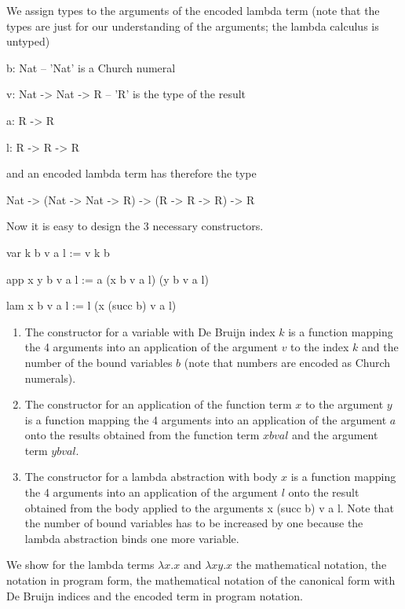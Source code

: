 \documentclass[12pt]{article}
\begin{document}
We assign types to the arguments of the encoded lambda term (note that the types
are just for our understanding of the arguments; the lambda calculus is untyped)
\begin{lam}
    b: Nat                  -- 'Nat' is a Church numeral

    v: Nat -> Nat -> R      -- 'R' is the type of the result

    a: R -> R

    l: R -> R -> R
\end{lam}
%
and an encoded lambda term has therefore the type
%
\begin{lam}
    Nat -> (Nat -> Nat -> R) -> (R -> R -> R) -> R
\end{lam}
%
%
Now it is easy to design the 3 necessary constructors.
\begin{lam}
    var k       b v a l  :=  v k b

    app x y     b v a l  :=  a (x b v a l) (y b v a l)

    lam x       b v a l  :=  l (x (succ b) v a l)
\end{lam}
%
\begin{enumerate}

    \item The constructor for a variable with De Bruijn index $k$ is a function
        mapping the 4 arguments into an application of the argument $v$ to the
        index $k$ and the number of the bound variables $b$ (note that numbers
        are encoded as Church numerals).

    \item The constructor for an application of the function term $x$ to the
        argument $y$ is a function mapping the 4 arguments into an application of
        the argument $a$ onto the results obtained from the function term $x b v
        a l$ and the argument term $y b v a l$.

    \item The constructor for a lambda abstraction with body $x$ is a function
        mapping the 4 arguments into an application of the argument $l$ onto the
        result obtained from the body applied to the arguments {x (succ b) v a
        l}. Note that the number of bound variables has to be increased by one
        because the lambda abstraction binds one more variable.
\end{enumerate}

We show for the lambda terms $\lambda x . x$ and $\lambda x y . x$ the
mathematical notation, the notation in program form, the mathematical notation
of the canonical form with De Bruijn indices and the encoded term in program
notation.
\end{document}
